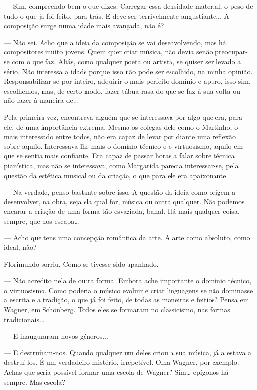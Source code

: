 --- Sim, compreendo bem o que dizes. Carregar essa densidade material, o
peso de tudo o que já foi feito, para trás. E deve ser terrivelmente
angustiante... A composição surge numa idade mais avançada, não é?

--- Não sei. Acho que a ideia da composição se vai desenvolvendo, mas há
compositores muito jovens. Quem quer criar música, não devia senão
preocupar-se com o que faz. Aliás, como qualquer poeta ou artista, se
quiser ser levado a sério. Não interessa a idade porque isso não pode
ser escolhido, na minha opinião. Responsabilizar-se por inteiro,
adquirir o mais perfeito domínio e apuro, isso sim, escolhemos, mas, de
certo modo, fazer tábua rasa do que se faz à sua volta ou não fazer à
maneira de...

Pela primeira vez, encontrava alguém que se interessava por algo que
era, para ele, de uma importância extrema. Mesmo os colegas dele como o
Martinho, o mais interessado entre todos, não era capaz de levar por
diante uma reflexão sobre aquilo. Interessava-lhe mais o domínio técnico
e o virtuosismo, aquilo em que se sentia mais confiante. Era capaz de
passar horas a falar sobre técnica pianística, mas não se interessava,
como Margarida parecia interessar-se, pela questão da estética musical
ou da criação, o que para ele era apaixonante.

--- Na verdade, penso bastante sobre isso. A questão da ideia como origem
a desenvolver, na obra, seja ela qual for, música ou outra qualquer. Não
podemos encarar a criação de uma forma tão esvaziada, banal. Há mais
qualquer coisa, sempre, que nos escapa\ldots{}

--- Acho que tens uma concepção romântica da arte. A arte como absoluto,
como ideal, não?

Florimundo sorriu. Como se tivesse sido apanhado.

--- Não acredito nela de outra forma. Embora ache importante o domínio
técnico, o virtuosismo. Como poderia o músico evoluir e criar linguagens
se não dominasse a escrita e a tradição, o que já foi feito, de todas as
maneiras e feitios? Pensa em Wagner, em Schönberg. Todos eles se
formaram no classicismo, nas formas tradicionais...

--- E inauguraram novos géneros...

--- E destruíram-nos. Quando qualquer um deles criou a sua música, já a
estava a destruí-los. É um verdadeiro mistério, irrepetível. Olha
Wagner, por exemplo. Achas que seria possível formar uma escola de
Wagner? Sim\ldots{} epígonos há sempre. Mas escola?

